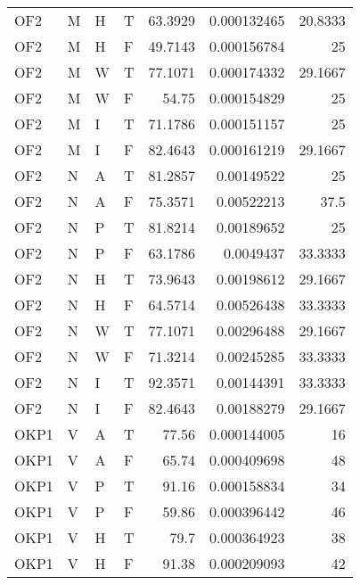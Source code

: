 \begin{longtable}{llllrrr}
    OF2      & M     & H     & T          & 63.3929    & 0.000132465 & 20.8333  \\
    OF2      & M     & H     & F          & 49.7143    & 0.000156784 & 25       \\
    OF2      & M     & W     & T          & 77.1071    & 0.000174332 & 29.1667  \\
    OF2      & M     & W     & F          & 54.75      & 0.000154829 & 25       \\
    OF2      & M     & I     & T          & 71.1786    & 0.000151157 & 25       \\
    OF2      & M     & I     & F          & 82.4643    & 0.000161219 & 29.1667  \\
    OF2      & N     & A     & T          & 81.2857    & 0.00149522  & 25       \\
    OF2      & N     & A     & F          & 75.3571    & 0.00522213  & 37.5     \\
    OF2      & N     & P     & T          & 81.8214    & 0.00189652  & 25       \\
    OF2      & N     & P     & F          & 63.1786    & 0.0049437   & 33.3333  \\
    OF2      & N     & H     & T          & 73.9643    & 0.00198612  & 29.1667  \\
    OF2      & N     & H     & F          & 64.5714    & 0.00526438  & 33.3333  \\
    OF2      & N     & W     & T          & 77.1071    & 0.00296488  & 29.1667  \\
    OF2      & N     & W     & F          & 71.3214    & 0.00245285  & 33.3333  \\
    OF2      & N     & I     & T          & 92.3571    & 0.00144391  & 33.3333  \\
    OF2      & N     & I     & F          & 82.4643    & 0.00188279  & 29.1667  \\
    OKP1     & V     & A     & T          & 77.56      & 0.000144005 & 16       \\
    OKP1     & V     & A     & F          & 65.74      & 0.000409698 & 48       \\
    OKP1     & V     & P     & T          & 91.16      & 0.000158834 & 34       \\
    OKP1     & V     & P     & F          & 59.86      & 0.000396442 & 46       \\
    OKP1     & V     & H     & T          & 79.7       & 0.000364923 & 38       \\
    OKP1     & V     & H     & F          & 91.38      & 0.000209093 & 42       \\

\end{longtable}
